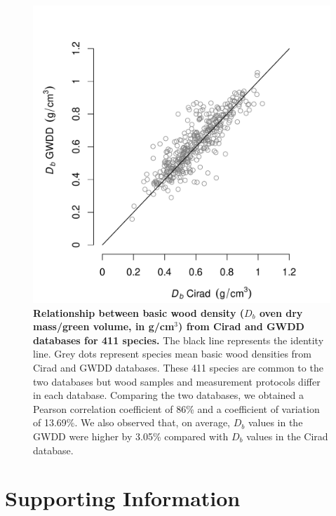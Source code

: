 \documentclass[a4paper, 12pt, leqno, dvipsnames]{article}\usepackage[]{graphicx}\usepackage[]{color}
\begin{document}
\begin{figure}[!ht] 
  \begin{center} 

    \includegraphics[width=12cm]{figs/Cirad-GWDD-Db.pdf}

    \caption{\textbf{Relationship between basic wood density ($D_b$ oven dry mass/green
        volume, in g/cm$^3$) from Cirad and GWDD databases for 411 species.} The black
      line represents the identity line. Grey dots represent species mean basic wood
      densities from Cirad and GWDD databases. These 411 species are common to the two
      databases but wood samples and measurement protocols differ in each
      database. Comparing the two databases, we obtained a Pearson correlation coefficient
      of 86\% and a coefficient of variation of 13.69\%. We also observed that, on average,
      $D_b$ values in the GWDD were higher by 3.05\% compared with $D_b$ values
      in the Cirad database.}
    
    \label{fig:Cirad-GWDD-Db}
  \end{center}
\end{figure}

\newpage

\section{Supporting Information}
\end{document}
